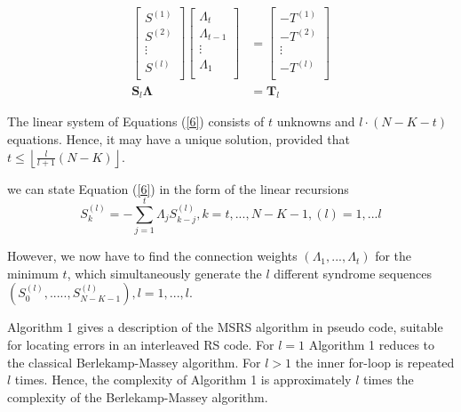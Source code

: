 \documentclass[fontsize=12pt]{article}
\begin{document}
\begin{equation}
\begin{split}
\begin{bmatrix}
    S^{(1)}  \\
    S^{(2)} \\
    \vdots{} \\
    S^{(l)}  \\
\end{bmatrix}
\begin{bmatrix}
    \Lambda_{t}\\
    \Lambda_{t-1}\\
    \vdots{}\\
    \Lambda_{1}\\
\end{bmatrix}
&=
\begin{bmatrix}
     -T^{(1)}\\
    -T^{(2)}\\
    \vdots{}\\
    -T^{(l)}\\
\end{bmatrix}\\
\mathbf{S}_l\mathbf{\Lambda}&=\mathbf{T}_l
\end{split}
\label{6}
\end{equation}

The linear system of Equations (\ref{6}) consists of $t$ unknowns and
$l\cdot (N-K-t)$ equations. Hence, it may have a unique solution,
provided that $t \leq \left \lfloor \frac{l}{l+1} ({N - K}) \right \rfloor$.

we can state Equation (\ref{6}) in the form of the linear recursions
\begin{equation}
S_k^{(\mathit{l})} = -\sum_{j=1}^{t} \Lambda_jS_{k-j}^{(\mathit{l})}, k=t,...,N-K-1, (\mathit{l})=1,...l
\end{equation}

However, we now have to find the connection weights $(\Lambda_1,...,\Lambda_t)$ for the minimum $t$, which simultaneously generate
the $l$ different syndrome sequences $(S_0^{(\mathit{l})},.....,S_{N-K-1}^{(\mathit{l})}), \mathit{l}=1,...,l$.

Algorithm 1 gives a description of the MSRS algorithm
in pseudo code, suitable for locating errors in an interleaved
RS code. For $l=1$ Algorithm 1  reduces to
the classical Berlekamp-Massey algorithm. For $l > 1$ the
inner for-loop is repeated $l$ times. Hence, the complexity
of Algorithm 1 is approximately $l$ times the complexity of
the Berlekamp-Massey algorithm.
\end{document}
